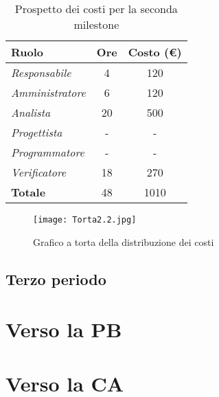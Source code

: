 \begin{table}[!ht]
    \centering
    \begin{tabular}{|l|c|c|}
    \hline
    \textbf{Ruolo} & \multicolumn{1}{l|}{\textbf{Ore}} & \multicolumn{1}{l|}{\textbf{Costo (€)}} \\ \hline
    \textit{Responsabile} & 4 & 120 \\ \hline
    \textit{Amministratore} & 6 & 120 \\ \hline
    \textit{Analista} & 20 & 500 \\ \hline
    \textit{Progettista} & - & - \\ \hline
    \textit{Programmatore} & - & - \\ \hline
    \textit{Verificatore} & 18 & 270 \\ \hline
    \textbf{Totale} & 48 & 1010 \\ \hline
    \end{tabular}
    \caption{Prospetto dei costi per la seconda milestone}
\end{table}

\begin{figure}[!ht]
    \texttt{[image: Torta2.2.jpg]}
    \caption{Grafico a torta della distribuzione dei costi} 
\end{figure}

\newpage
\subsection{Terzo periodo}

\section{Verso la PB}

\section{Verso la CA}
